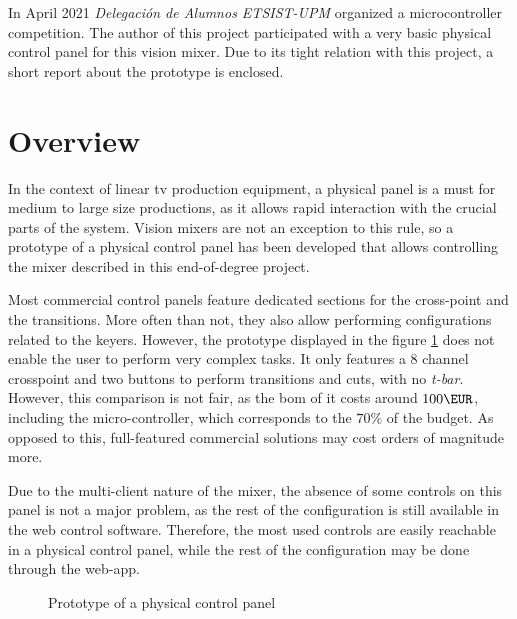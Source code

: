 \documentclass[../main.tex]{subfiles}
\begin{document}
\label{chap:control}

In April 2021 \textit{Delegación de Alumnos ETSIST-UPM} organized a microcontroller competition. The author of this project participated with a very basic physical control panel for this vision mixer. Due to its tight relation with this project, a short report about the prototype is enclosed.\newline

\section{Overview}
In the context of linear \gls{tv} production equipment, a physical panel is a must for medium to large size productions, as it allows rapid interaction with the crucial parts of the system. Vision mixers are not an exception to this rule, so a prototype of a physical control panel has been developed that allows controlling the mixer described in this end-of-degree project.\newline


Most commercial control panels feature dedicated sections for the cross-point and the transitions. More often than not, they also allow performing configurations related to the keyers. However, the prototype displayed in the figure \ref{fig:control_panel_proto} does not enable the user to perform very complex tasks. It only features a 8 channel crosspoint and two buttons to perform transitions and cuts, with no \textit{t-bar}. However, this comparison is not fair, as the \gls{bom} of it costs around $100 \si{\EUR}$, including the micro-controller, which corresponds to the $70 \si{\%}$ of the budget. As opposed to this, full-featured commercial solutions may cost orders of magnitude more.\newline

Due to the multi-client nature of the mixer, the absence of some controls on this panel is not a major problem, as the rest of the configuration is still available in the web control software. Therefore, the most used controls are easily reachable in a physical control panel, while the rest of the configuration may be done through the web-app.\newline

\begin{figure}[hbtp]
    \centering

    \caption{Prototype of a physical control panel}
    \label{fig:control_panel_proto}
\end{figure}
\end{document}
